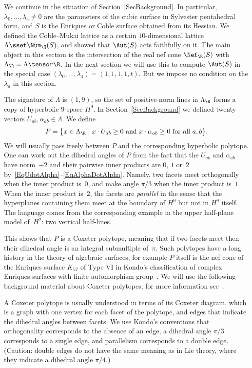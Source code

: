 We continue in the situation of Section~\ref{SecBackground}. In particular, $\lambda_0,\dots,\lambda_4\neq0$ are the parameters of the cubic surface in Sylvester pentahedral form, and $S$ is the Enriques or Coble surface obtained from its Hessian. We defined the Coble--Mukai lattice as a certain $10$-dimensional lattice $\Lambda\sset\Num_\Q(S)$, and showed that $\Aut(S)$ acts faithfully on it. The main object in this section is the intersection of the real nef cone $\Nef_\R(S)$ with $\Lambda_\R=\Lambda\tensor\R$. In the next section we will use this to compute $\Aut(S)$ in the special case $(\lambda_0,\dots,\lambda_4)=(1,1,1,1,t)$. But we impose no condition on the $\lambda_a$ in this section.

The signature of $\Lambda$ is $(1,9)$, so the set of positive-norm lines in $\Lambda_\R$ forms a copy of hyperbolic $9$-space $H^9$. In Section~\ref{SecBackground} we defined twenty vectors $U_{ab},\alpha_{ab}\in\Lambda$. We define
\begin{equation*}
P=\bigl\{ x\in\Lambda_\R
\bigm|x\cdot U_{ab}\geq0\text{ and }x\cdot\alpha_{ab}\geq0\text{ for all }a,b
\bigr\}.
\end{equation*}
We will usually pass freely between $P$ and the corresponding hyperbolic polytope. One can work out the dihedral angles of $P$ from the fact that the $U_{ab}$ and $\alpha_{ab}$ have norm~$-2$ and their pairwise inner products are $0$, $1$ or~$2$ by~\eqref{EqUdotAlpha}--\eqref{EqAlphaDotAlpha}. Namely, two facets meet orthogonally when the inner product is~$0$, and make angle $\pi/3$ when the inner product is~$1$. When the inner product is~$2$, the facets are \emph{parallel} in the sense that the hyperplanes containing them meet at the boundary of $H^9$ but not in $H^9$ itself. The language comes from the corresponding example in the upper half-plane model of~$H^2$: two vertical half-lines.

This shows that $P$ is a Coxeter polytope, meaning that if two facets meet then their dihedral angle is an integral submultiple of~$\pi$. Such polytopes have a long history in the theory of algebraic surfaces, for example $P$ itself is the nef cone of the Enriques surface $K_{VI}$ of Type VI in Kondo's classification of complex Enriques surfaces with finite automorphism group~\cite{Kondo}. We will use the following background material about Coxeter polytopes; for more information see~\cite{DolgachevBulletin,Vinberg2}.

A Coxeter polytope is usually understood in terms of its Coxeter diagram, which is a graph with one vertex for each facet of the polytope, and edges that indicate the dihedral angles between facets. We use Kondo's conventions that orthogonality corresponds to the absence of an edge, a dihedral angle $\pi/3$ corresponds to a single edge, and parallelism corresponds to a double edge. (Caution: double edges do not have the same meaning as in Lie theory, where they indicate a dihedral angle $\pi/4$.)

